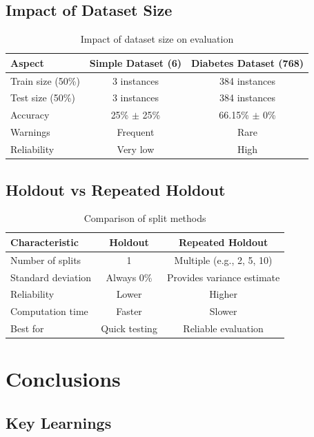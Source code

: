 \documentclass[12pt,a4paper]{article}
\begin{document}
\subsection{Impact of Dataset Size}

\begin{table}[H]
\centering
\begin{tabular}{|l|c|c|}
\hline
\textbf{Aspect} & \textbf{Simple Dataset (6)} & \textbf{Diabetes Dataset (768)} \\
\hline
Train size (50\%) & 3 instances & 384 instances \\
Test size (50\%) & 3 instances & 384 instances \\
Accuracy & 25\% $\pm$ 25\% & 66.15\% $\pm$ 0\% \\
Warnings & Frequent & Rare \\
Reliability & Very low & High \\
\hline
\end{tabular}
\caption{Impact of dataset size on evaluation}
\end{table}

\subsection{Holdout vs Repeated Holdout}

\begin{table}[H]
\centering
\begin{tabular}{|l|c|c|}
\hline
\textbf{Characteristic} & \textbf{Holdout} & \textbf{Repeated Holdout} \\
\hline
Number of splits & 1 & Multiple (e.g., 2, 5, 10) \\
Standard deviation & Always 0\% & Provides variance estimate \\
Reliability & Lower & Higher \\
Computation time & Faster & Slower \\
Best for & Quick testing & Reliable evaluation \\
\hline
\end{tabular}
\caption{Comparison of split methods}
\end{table}

\section{Conclusions}

\subsection{Key Learnings}
\end{document}
